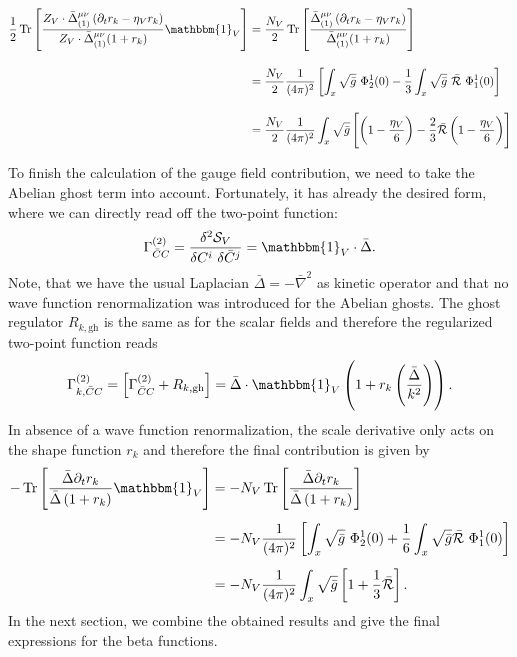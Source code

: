 \begin{align}
	\frac{1}{2}\tr{\frac{Z_V\cdot\bar{\Delta}^{\mu\nu}_{(1)}\left(\partial_t r_k - \eta_Vr_k\right)}{Z_V\cdot\bar{\Delta}^{\mu\nu}_{(1)}(1+r_k)}\mathbbm{1}_V} &= \frac{N_V}{2}\tr{\frac{\bar{\Delta}^{\mu\nu}_{(1)}\left(\partial_t r_k - \eta_Vr_k\right)}{\bar{\Delta}^{\mu\nu}_{(1)}(1+r_k)}}\nonumber \\[10pt]
	&= \frac{N_V}{2}\frac{1}{(4\pi)^2}\left[\int_x\sqrt{\bar{g}}\ \Phi_2^1(0) - \frac{1}{3}\int_x\sqrt{\bar{g}}\  \bar{\mathcal{R}} \  \Phi_1^1(0) \right] \\[10pt]
	&=  \frac{N_V}{2}\frac{1}{(4\pi)^2}\int_x\sqrt{\bar{g}}\left[\left(1-\frac{\eta_V}{6}\right)- \frac{2}{3}\bar{\mathcal{R}}\left(1-\frac{\eta_V}{6}\right)\right]\nonumber
\end{align}


To finish the calculation of the gauge field contribution, we need to take the Abelian ghost term into account. Fortunately, it has already the desired form, where we can directly read off the two-point function:
\begin{equation}
	\Gamma^{(2)}_{\bar{C}C} = \frac{\delta^2 \mathcal{S}_V}{\delta C^{i}\ \delta \bar{C}^{j}} = \mathbbm{1}_V\cdot\bar{\Delta}.
\end{equation} 
Note, that we have the usual Laplacian $\bar{\Delta} = -\bar{\nabla}^2$ as kinetic operator and that no wave function renormalization was introduced for the Abelian ghosts. The ghost regulator $R_{k, \mathrm{gh}}$ is the same as for the scalar fields and therefore the regularized two-point function reads
\begin{equation}
		\Gamma^{(2)}_{k, \bar{C}C} = \left[\Gamma^{(2)}_{ \bar{C}C}+ R_{k, \mathrm{gh}}\right]  = \bar{\Delta}\cdot\mathbbm{1}_V\left(1 + r_k\left(\frac{\bar{\Delta}}{k^2}\right)\right).
\end{equation} 
In absence of a wave function renormalization, the scale derivative only acts on the shape function $r_k$ and  therefore the final contribution is given by 
\begin{equation}
\begin{aligned}
	-\tr{\frac{\bar{\Delta}\partial_tr_k}{\bar{\Delta}\left(1+r_k\right)}\mathbbm{1}_V} &= -N_{V}\tr{\frac{\bar{\Delta}\partial_tr_k}{\bar{\Delta}\left(1+r_k\right)}} \\[5pt]
	&= -N_V\frac{1}{(4\pi)^2}\left[\int_x\sqrt{\bar{g}} \ \Phi_2^1(0) + \frac{1}{6}\int_x\sqrt{\bar{g}} \bar{\mathcal{R}} \ \Phi_1^1(0) \right] \\[5pt]
	&= -N_V\frac{1}{(4\pi)^2}\int_x\sqrt{\bar{g}}\left[1 + \frac{1}{3}\bar{\mathcal{R}}\right].	
\end{aligned}
\end{equation}  
In the next section, we combine the obtained results and  give the final expressions for the beta functions. 

